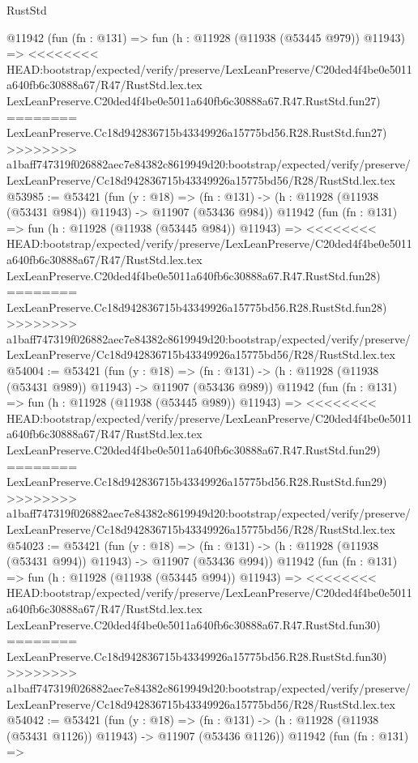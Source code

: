 \begin{lexlean}{RustStd}
\begin{coremodule}
{\begin{coremodule}
{{{{{{{{{{{{{{{{{{{{{{{{{{{{{{{{{{{{{{{{{{{{{{{{{{{{{{{{{{{{{{{{{{{{{{{{{{{{{{{{    @11942
    (fun (fn : @131) =>
    fun (h : @11928 (@11938 (@53445 @979)) @11943) =>
<<<<<<<< HEAD:bootstrap/expected/verify/preserve/LexLeanPreserve/C20ded4f4be0e5011a640fb6c30888a67/R47/RustStd.lex.tex
    LexLeanPreserve.C20ded4f4be0e5011a640fb6c30888a67.R47.RustStd.fun27)
========
    LexLeanPreserve.Cc18d942836715b43349926a15775bd56.R28.RustStd.fun27)
>>>>>>>> a1baff747319f026882aec7e84382c8619949d20:bootstrap/expected/verify/preserve/LexLeanPreserve/Cc18d942836715b43349926a15775bd56/R28/RustStd.lex.tex
@53985 := @53421
    (fun (y : @18) =>
    (fn : @131) -> (h : @11928 (@11938 (@53431 @984)) @11943) -> @11907 (@53436 @984))
    @11942
    (fun (fn : @131) =>
    fun (h : @11928 (@11938 (@53445 @984)) @11943) =>
<<<<<<<< HEAD:bootstrap/expected/verify/preserve/LexLeanPreserve/C20ded4f4be0e5011a640fb6c30888a67/R47/RustStd.lex.tex
    LexLeanPreserve.C20ded4f4be0e5011a640fb6c30888a67.R47.RustStd.fun28)
========
    LexLeanPreserve.Cc18d942836715b43349926a15775bd56.R28.RustStd.fun28)
>>>>>>>> a1baff747319f026882aec7e84382c8619949d20:bootstrap/expected/verify/preserve/LexLeanPreserve/Cc18d942836715b43349926a15775bd56/R28/RustStd.lex.tex
@54004 := @53421
    (fun (y : @18) =>
    (fn : @131) -> (h : @11928 (@11938 (@53431 @989)) @11943) -> @11907 (@53436 @989))
    @11942
    (fun (fn : @131) =>
    fun (h : @11928 (@11938 (@53445 @989)) @11943) =>
<<<<<<<< HEAD:bootstrap/expected/verify/preserve/LexLeanPreserve/C20ded4f4be0e5011a640fb6c30888a67/R47/RustStd.lex.tex
    LexLeanPreserve.C20ded4f4be0e5011a640fb6c30888a67.R47.RustStd.fun29)
========
    LexLeanPreserve.Cc18d942836715b43349926a15775bd56.R28.RustStd.fun29)
>>>>>>>> a1baff747319f026882aec7e84382c8619949d20:bootstrap/expected/verify/preserve/LexLeanPreserve/Cc18d942836715b43349926a15775bd56/R28/RustStd.lex.tex
@54023 := @53421
    (fun (y : @18) =>
    (fn : @131) -> (h : @11928 (@11938 (@53431 @994)) @11943) -> @11907 (@53436 @994))
    @11942
    (fun (fn : @131) =>
    fun (h : @11928 (@11938 (@53445 @994)) @11943) =>
<<<<<<<< HEAD:bootstrap/expected/verify/preserve/LexLeanPreserve/C20ded4f4be0e5011a640fb6c30888a67/R47/RustStd.lex.tex
    LexLeanPreserve.C20ded4f4be0e5011a640fb6c30888a67.R47.RustStd.fun30)
========
    LexLeanPreserve.Cc18d942836715b43349926a15775bd56.R28.RustStd.fun30)
>>>>>>>> a1baff747319f026882aec7e84382c8619949d20:bootstrap/expected/verify/preserve/LexLeanPreserve/Cc18d942836715b43349926a15775bd56/R28/RustStd.lex.tex
@54042 := @53421
    (fun (y : @18) =>
    (fn : @131) -> (h : @11928 (@11938 (@53431 @1126)) @11943) -> @11907 (@53436 @1126))
    @11942
    (fun (fn : @131) =>
}}}}}}}}}}}}}}}}}}}}}}}}}}}}}}}}}}}}}}}}}}}}}}}}}}}}}}}}}}}}}}}}}}}}}}}}}}}}}}}}
\end{coremodule}}
\end{coremodule}
\end{lexlean}

